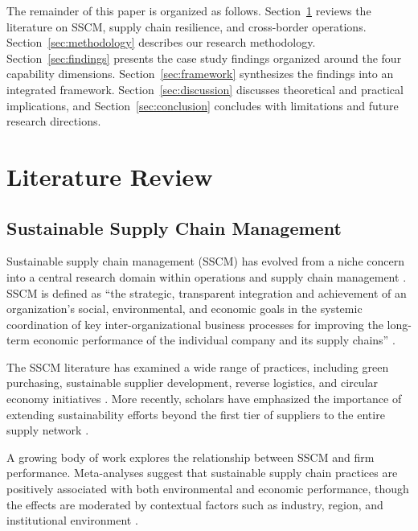 \documentclass[12pt,a4paper,twoside]{article}
\begin{document}
The remainder of this paper is organized as follows.  Section~\ref{sec:literature}
reviews the literature on SSCM, supply chain resilience, and cross-border
operations.  Section~\ref{sec:methodology} describes our research methodology.
Section~\ref{sec:findings} presents the case study findings organized around the
four capability dimensions.  Section~\ref{sec:framework} synthesizes the findings
into an integrated framework.  Section~\ref{sec:discussion} discusses theoretical
and practical implications, and Section~\ref{sec:conclusion} concludes with
limitations and future research directions.

\section{Literature Review}
\label{sec:literature}

\subsection{Sustainable Supply Chain Management}

Sustainable supply chain management (SSCM) has evolved from a niche concern
into a central research domain within operations and supply chain management
\citep{carter2008framework, seuring2008sustainability}.  SSCM is defined as
``the strategic, transparent integration and achievement of an organization's
social, environmental, and economic goals in the systemic coordination of key
inter-organizational business processes for improving the long-term economic
performance of the individual company and its supply chains''
\citep[p.~1700]{carter2008framework}.

The SSCM literature has examined a wide range of practices, including green
purchasing, sustainable supplier development, reverse logistics, and circular
economy initiatives \citep{govindan2015reverse, kirchherr2017conceptualizing}.
More recently, scholars have emphasized the importance of extending
sustainability efforts beyond the first tier of suppliers to the entire supply
network \citep{wilhelm2016sustainability, villena2018missing}.

A growing body of work explores the relationship between SSCM and firm
performance.  Meta-analyses suggest that sustainable supply chain practices are
positively associated with both environmental and economic performance, though
the effects are moderated by contextual factors such as industry, region, and
institutional environment \citep{golicic2013meta, govindan2020supply}.
\end{document}
